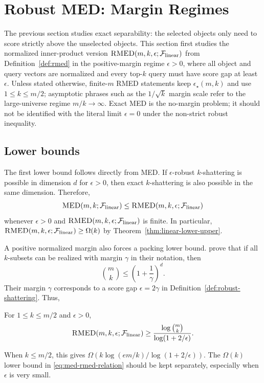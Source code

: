 \documentclass{article}
\begin{document}
\section{Robust MED: Margin Regimes}\label{sec:rmed-theory}

The previous section studies exact separability: the selected objects only need to score strictly above the unselected objects. This section first studies the normalized inner-product version $\textsc{RMED}(m,k,\epsilon;\mathcal{F}_{\rm linear})$ from Definition~\ref{def:rmed} in the positive-margin regime $\epsilon>0$, where all object and query vectors are normalized and every top-$k$ query must have score gap at least $\epsilon$. Unless stated otherwise, finite-$m$ RMED statements keep $\epsilon_\star(m,k)$ and use $1\leq k\leq m/2$; asymptotic phrases such as the $1/\sqrt{k}$ margin scale refer to the large-universe regime $m/k\to\infty$. Exact MED is the no-margin problem; it should not be identified with the literal limit $\epsilon=0$ under the non-strict robust inequality.

\subsection{Lower bounds}

The first lower bound follows directly from MED. If $\epsilon$-robust $k$-shattering is possible in dimension $d$ for $\epsilon>0$, then exact $k$-shattering is also possible in the same dimension. Therefore,
\begin{align}
    \textsc{MED}(m,k;\mathcal{F}_{\rm linear}) \leq \textsc{RMED}(m,k,\epsilon;\mathcal{F}_{\rm linear})
    \label{eq:med-rmed-relation}
\end{align}
whenever $\epsilon>0$ and $\textsc{RMED}(m,k,\epsilon;\mathcal{F}_{\rm linear})$ is finite. In particular, $\textsc{RMED}(m,k,\epsilon;\mathcal{F}_{\rm linear})\geq \Omega(k)$ by Theorem~\ref{thm:linear-lower-upper}.

A positive normalized margin also forces a packing lower bound. \citet{weller2025theoretical} prove that if all $k$-subsets can be realized with margin $\gamma$ in their notation, then
\[
    \binom{m}{k} \leq \left(1+\frac{1}{\gamma}\right)^d .
\]
Their margin $\gamma$ corresponds to a score gap $\epsilon=2\gamma$ in Definition~\ref{def:robust-shattering}. Thus,
\begin{theorem}\label{thm:rmed-packing}
For $1\leq k\leq m/2$ and $\epsilon>0$,
\begin{align}
    \textsc{RMED}(m,k,\epsilon;\mathcal{F}_{\rm linear})
    \geq
    \frac{\log \binom{m}{k}}{\log(1+2/\epsilon)}.
    \label{eq:rmed-packing}
\end{align}
\end{theorem}
When $k\leq m/2$, this gives $\Omega(k\log(em/k)/\log(1+2/\epsilon))$. The $\Omega(k)$ lower bound in \eqref{eq:med-rmed-relation} should be kept separately, especially when $\epsilon$ is very small.
\end{document}

